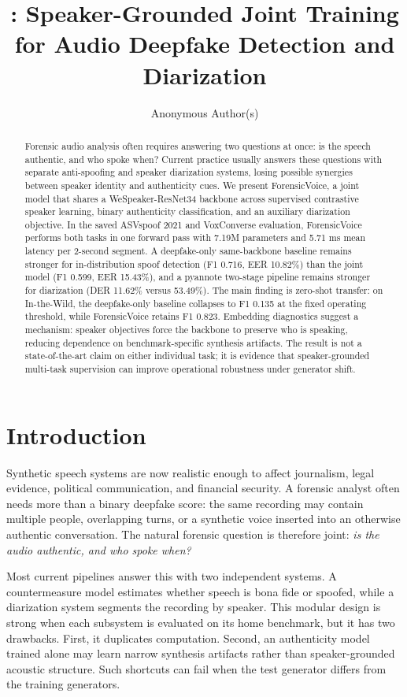 \documentclass{article}
\title{\fv{}: Speaker-Grounded Joint Training for Audio Deepfake Detection and Diarization}
\author{Anonymous Author(s)}
\newcommand{\fv}{ForensicVoice}
\newcommand{\eer}{EER}
\newcommand{\der}{DER}
\newcommand{\asv}{ASVspoof}
\newcommand{\itw}{In-the-Wild}
\begin{document}
\maketitle

\begin{abstract}
Forensic audio analysis often requires answering two questions at once: is the
speech authentic, and who spoke when?  Current practice usually answers these
questions with separate anti-spoofing and speaker diarization systems, losing
possible synergies between speaker identity and authenticity cues.  We present
\fv{}, a joint model that shares a WeSpeaker-ResNet34 backbone across supervised
contrastive speaker learning, binary authenticity classification, and an
auxiliary diarization objective.  In the saved \asv{} 2021 and VoxConverse
evaluation, \fv{} performs both tasks in one forward pass with 7.19M parameters
and 5.71 ms mean latency per 2-second segment.  A deepfake-only same-backbone
baseline remains stronger for in-distribution spoof detection (F1 0.716,
\eer{} 10.82\%) than the joint model (F1 0.599, \eer{} 15.43\%), and a
pyannote two-stage pipeline remains stronger for diarization (\der{} 11.62\%
versus 53.49\%).  The main finding is zero-shot transfer: on \itw{}, the
deepfake-only baseline collapses to F1 0.135 at the fixed operating threshold,
while \fv{} retains F1 0.823.  Embedding diagnostics suggest a mechanism:
speaker objectives force the backbone to preserve who is speaking, reducing
dependence on benchmark-specific synthesis artifacts.  The result is not a
state-of-the-art claim on either individual task; it is evidence that
speaker-grounded multi-task supervision can improve operational robustness
under generator shift.
\end{abstract}

\section{Introduction}

Synthetic speech systems are now realistic enough to affect journalism, legal
evidence, political communication, and financial security.  A forensic analyst
often needs more than a binary deepfake score: the same recording may contain
multiple people, overlapping turns, or a synthetic voice inserted into an
otherwise authentic conversation.  The natural forensic question is therefore
joint: \emph{is the audio authentic, and who spoke when?}

Most current pipelines answer this with two independent systems.  A
countermeasure model estimates whether speech is bona fide or spoofed, while a
diarization system segments the recording by speaker.  This modular design is
strong when each subsystem is evaluated on its home benchmark, but it has two
drawbacks.  First, it duplicates computation.  Second, an authenticity model
trained alone may learn narrow synthesis artifacts rather than speaker-grounded
acoustic structure.  Such shortcuts can fail when the test generator differs
from the training generators.
\end{document}

